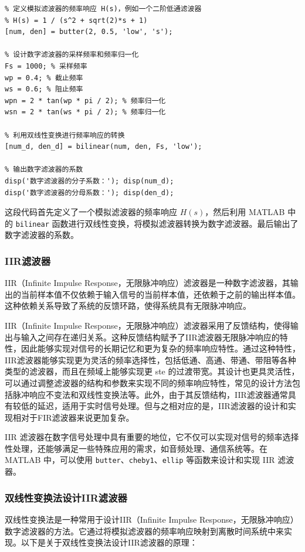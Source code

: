 \documentclass[a4paper,12pt]{article}
\begin{document}
\begin{lstlisting}
% 定义模拟滤波器的频率响应 H(s)，例如一个二阶低通滤波器
% H(s) = 1 / (s^2 + sqrt(2)*s + 1)
[num, den] = butter(2, 0.5, 'low', 's');

% 设计数字滤波器的采样频率和频率归一化
Fs = 1000; % 采样频率
wp = 0.4; % 截止频率
ws = 0.6; % 阻止频率
wpn = 2 * tan(wp * pi / 2); % 频率归一化
wsn = 2 * tan(ws * pi / 2); % 频率归一化

% 利用双线性变换进行频率响应的转换
[num_d, den_d] = bilinear(num, den, Fs, 'low');

% 输出数字滤波器的系数
disp('数字滤波器的分子系数：'); disp(num_d);
disp('数字滤波器的分母系数：'); disp(den_d);
\end{lstlisting}



这段代码首先定义了一个模拟滤波器的频率响应 \( H(s) \)，然后利用 MATLAB 中的 \texttt{bilinear} 函数进行双线性变换，将模拟滤波器转换为数字滤波器。最后输出了数字滤波器的系数。

\subsubsection{IIR滤波器}
IIR（Infinite Impulse Response，无限脉冲响应）滤波器是一种数字滤波器，其输出的当前样本值不仅依赖于输入信号的当前样本值，还依赖于之前的输出样本值。这种依赖关系导致了系统的反馈环路，使得系统具有无限脉冲响应。

IIR（Infinite Impulse Response，无限脉冲响应）滤波器采用了反馈结构，使得输出与输入之间存在递归关系。这种反馈结构赋予了IIR滤波器无限脉冲响应的特性，因此能够实现对信号的长期记忆和更为复杂的频率响应特性。通过这种特性，IIR滤波器能够实现更为灵活的频率选择性，包括低通、高通、带通、带阻等各种类型的滤波器，而且在频域上能够实现更 ste 的过渡带宽。其设计也更具灵活性，可以通过调整滤波器的结构和参数来实现不同的频率响应特性，常见的设计方法包括脉冲响应不变法和双线性变换法等。此外，由于其反馈结构，IIR滤波器通常具有较低的延迟，适用于实时信号处理。但与之相对应的是，IIR滤波器的设计和实现相对于FIR滤波器来说更加复杂。

IIR 滤波器在数字信号处理中具有重要的地位，它不仅可以实现对信号的频率选择性处理，还能够满足一些特殊应用的需求，如音频处理、通信系统等。在 MATLAB 中，可以使用 \texttt{butter}、\texttt{cheby1}、\texttt{ellip} 等函数来设计和实现 IIR 滤波器。

\subsubsection{双线性变换法设计IIR滤波器}
双线性变换法是一种常用于设计IIR（Infinite Impulse Response，无限脉冲响应）数字滤波器的方法。它通过将模拟滤波器的频率响应映射到离散时间系统中来实现。以下是关于双线性变换法设计IIR滤波器的原理：
\end{document}
